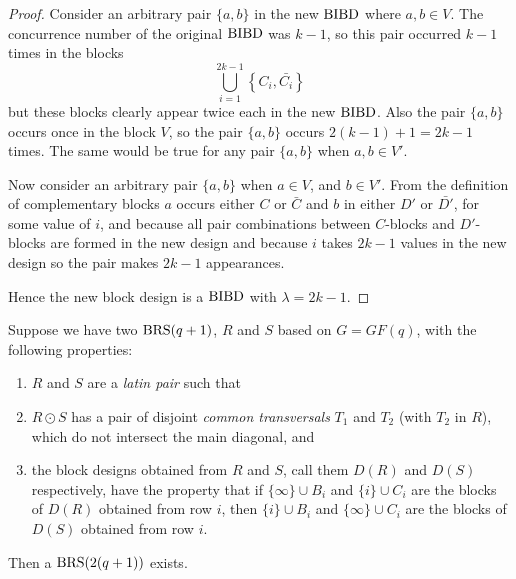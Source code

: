\begin{proof}
Consider an arbitrary pair $\{a, b\}$ in the new $\operatorname{BIBD}$ where $a, b \in V$.
The concurrence number of the original $\operatorname{BIBD}$ was $k - 1$, so this pair occurred $k - 1$ times in the blocks
\begin{equation}
\bigcup\limits_{i = 1}^{2k - 1} \left\{C_i, \bar{C_i} \right\}
\end{equation}
but these blocks clearly appear twice each in the new $\operatorname{BIBD}$.
Also the pair $\{a, b\}$ occurs once in the block $V$, so the pair $\{a, b\}$ occurs $2(k - 1) + 1 = 2k - 1$ times.
The same would be true for any pair $\{a, b\}$ when $a, b \in V'$.

Now consider an arbitrary pair $\{a, b\}$ when $a \in V$, and $b \in V'$.
From the definition of complementary blocks $a$ occurs either $C$ or $\bar{C}$ and $b$ in either $D'$ or $\bar{D'}$, for some value of $i$, and because all pair combinations between $C$-blocks and $D'$-blocks are formed in the new design and because $i$ takes $2k - 1$ values in the new design so the pair makes $2k - 1$ appearances.

Hence the new block design is a $\operatorname{BIBD}$ with $\lambda = 2k - 1$.
\end{proof}

\begin{theorem}
\label{thm:schellenberg}
Suppose we have two $\operatorname{BRS}(q+1)$, $R$ and $S$ based on $G = GF(q)$, with the following properties:
\begin{enumerate}
  \item{$R$ and $S$ are a \emph{latin pair} such that}
  \item{$R \odot S$ has a pair of disjoint \emph{common transversals}
    $T_1$ and $T_2$ (with $T_2$ in $R$), which do not
    intersect the main diagonal, and}
  \item{the block designs obtained from $R$ and $S$, call them
    $D(R)$ and $D(S)$ respectively, have the property that
    if $\{\infty\} \cup B_i$ and $\{i\} \cup C_i$ are the
    blocks of $D(R)$ obtained from row $i$, then $\{i\} \cup
    B_i$ and $\{\infty\} \cup C_i$ are the blocks of $D(S)$
    obtained from row $i$.}
\end{enumerate}

Then a $\operatorname{BRS}(2(q + 1))$ exists.
\end{theorem}

